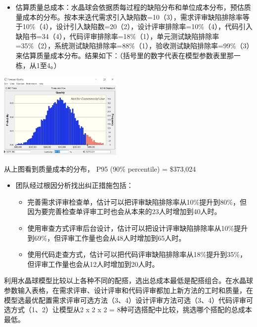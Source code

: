 \begin{itemize}
\tightlist
\item
  估算质量总成本：水晶球会依据质每过程的缺陷分布和单位成本分布，预估质量成本的分布。按本来迭代需求引入缺陷数=10（3），需求评审缺陷排除率等于10\%（4），设计引入缺陷数=20（2），设计评审排除率=10\%（4），代码引入缺陷书=34（4），代码评审排除率=18\%（1），单元测试缺陷排除率=35\%（2），系统测试缺陷排除率=88\%（1），验收测试缺陷排除率=99\%（3）来估算质量成本分布。结果如下：（括号里的数字代表在模型参数表里那一栋，从1至4。）
\end{itemize}



\includegraphics[width=6cm]{startQUA95.PNG}

从上图看到质量成本的分布， P95 (90\% percentile) = \$373,024

\begin{itemize}
\tightlist
\item
  团队经过根因分析找出纠正措施包括：

  \begin{itemize}
  \tightlist
  \item
    完善需求评审检查单，估计可以把评审缺陷排除率从10\%提升到80\%，但因为要完善检查单评审工时也会从本来的23人时增加到40人时。
  \item
    使用审查方式评审后台设计，估计可以把设计评审缺陷排除率从10\%提升到69\%，但评审工作量也会从48人时增加到65人时。
  \item
    使用代码走查方式，估计可以把代码评审缺陷排除率从18\%提升到35\%，但评审工作量也会从12人时增加到20人时。
  \end{itemize}
\end{itemize}

利用水晶球模型比较以上各种不同的配搭，选出总成本最低是配搭组合。在水晶球参数输入表格，在需求评审、设计评审和代码评审都加上新方法的工时和质量，在模型选最优配置需求评审可选方法（3、4）设计评审方法可选（3、4）代码评审可选方式（1、2）让模型从2
x 2 x 2 = 8种可选搭配中比较，挑选哪个搭配的总成本最低。

